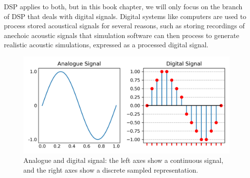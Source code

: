 DSP applies to both, but in this book chapter, we will only focus on the branch of DSP that deals with digital signals. Digital systems like computers are used to process stored acoustical signals for several reasons, such as storing recordings of anechoic acoustic signals that simulation software can then process to generate realistic acoustic simulations, expressed as a processed digital signal. \par
\begin{figure}
    \centering
    \includegraphics[width=1\linewidth]{analogue_digital}
    \caption{Analogue and digital signal: the left axes show a continuous signal, and the right axes show a discrete sampled representation.}
    \label{fig:analogue-digital-signal}
\end{figure}

